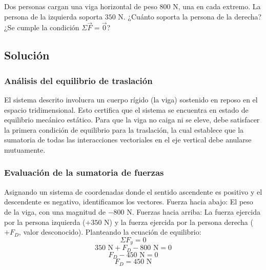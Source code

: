 \documentclass[12pt, a4paper]{article}
\begin{document}
Dos personas cargan una viga horizontal de peso $800 \text{ N}$, una en cada extremo. La persona de la izquierda soporta $350 \text{ N}$. ¿Cuánto soporta la persona de la derecha? ¿Se cumple la condición $\Sigma\vec{F} = \vec{0}$?

\subsection*{Solución}

\subsubsection*{Análisis del equilibrio de traslación}
El sistema descrito involucra un cuerpo rígido (la viga) sostenido en reposo en el espacio tridimensional. Esto certifica que el sistema se encuentra en estado de equilibrio mecánico estático. Para que la viga no caiga ni se eleve, debe satisfacer la primera condición de equilibrio para la traslación, la cual establece que la sumatoria de todas las interacciones vectoriales en el eje vertical debe anularse mutuamente.

\subsubsection*{Evaluación de la sumatoria de fuerzas}
Asignando un sistema de coordenadas donde el sentido ascendente es positivo y el descendente es negativo, identificamos los vectores.
Fuerza hacia abajo: El peso de la viga, con una magnitud de $-800 \text{ N}$.
Fuerzas hacia arriba: La fuerza ejercida por la persona izquierda ($+350 \text{ N}$) y la fuerza ejercida por la persona derecha ($+F_D$, valor desconocido).
Planteando la ecuación de equilibrio:
$$\Sigma F_y = 0$$
$$350 \text{ N} + F_D - 800 \text{ N} = 0$$
$$F_D - 450 \text{ N} = 0$$
$$F_D = 450 \text{ N}$$
\end{document}
